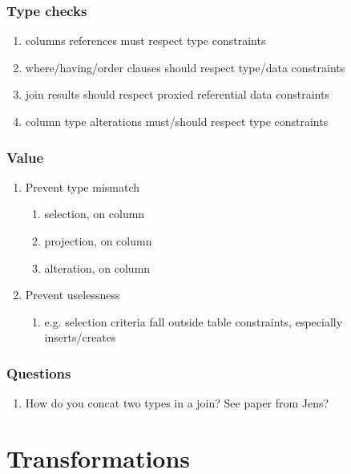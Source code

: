 \documentclass[12pt]{article}
\begin{document}
\subsubsection{Type checks}

\begin{enumerate}
  \item columns references must respect type constraints
  \item where/having/order clauses should respect type/data constraints
  \item join results should respect proxied referential data constraints
  \item column type alterations must/should respect type constraints
\end{enumerate}

\subsubsection{Value}
\begin{enumerate}
  \item Prevent type mismatch
    \begin{enumerate}
      \item selection,  on  column
      \item projection,  on  column
      \item alteration,  on  column
    \end{enumerate}
  \item Prevent uselessness
    \begin{enumerate}
      \item e.g. selection criteria fall outside table constraints, especially inserts/creates
    \end{enumerate}
\end{enumerate}

\subsubsection{Questions}
\begin{enumerate}
  \item How do you concat two types in a join? See paper from Jens?
\end{enumerate}

\newpage

\section{Transformations}
\end{document}
